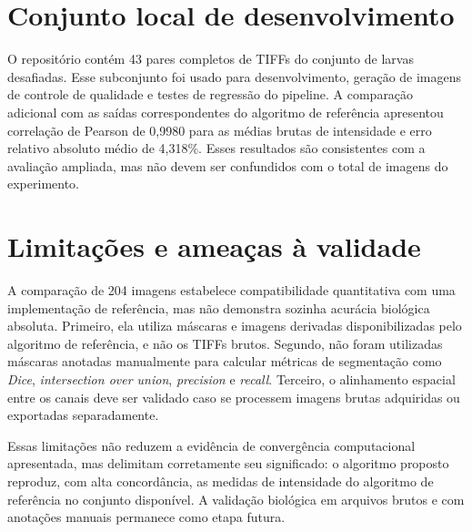 \section{Conjunto local de desenvolvimento}

O repositório contém 43 pares completos de TIFFs do conjunto de larvas desafiadas. Esse subconjunto foi usado para desenvolvimento, geração de imagens de controle de qualidade e testes de regressão do pipeline. A comparação adicional com as saídas correspondentes do algoritmo de referência apresentou correlação de Pearson de 0,9980 para as médias brutas de intensidade e erro relativo absoluto médio de 4,318\%. Esses resultados são consistentes com a avaliação ampliada, mas não devem ser confundidos com o total de imagens do experimento.

\section{Limitações e ameaças à validade}

A comparação de 204 imagens estabelece compatibilidade quantitativa com uma implementação de referência, mas não demonstra sozinha acurácia biológica absoluta. Primeiro, ela utiliza máscaras e imagens derivadas disponibilizadas pelo algoritmo de referência, e não os TIFFs brutos. Segundo, não foram utilizadas máscaras anotadas manualmente para calcular métricas de segmentação como \textit{Dice}, \textit{intersection over union}, \textit{precision} e \textit{recall}. Terceiro, o alinhamento espacial entre os canais deve ser validado caso se processem imagens brutas adquiridas ou exportadas separadamente.

Essas limitações não reduzem a evidência de convergência computacional apresentada, mas delimitam corretamente seu significado: o algoritmo proposto reproduz, com alta concordância, as medidas de intensidade do algoritmo de referência no conjunto disponível. A validação biológica em arquivos brutos e com anotações manuais permanece como etapa futura.
